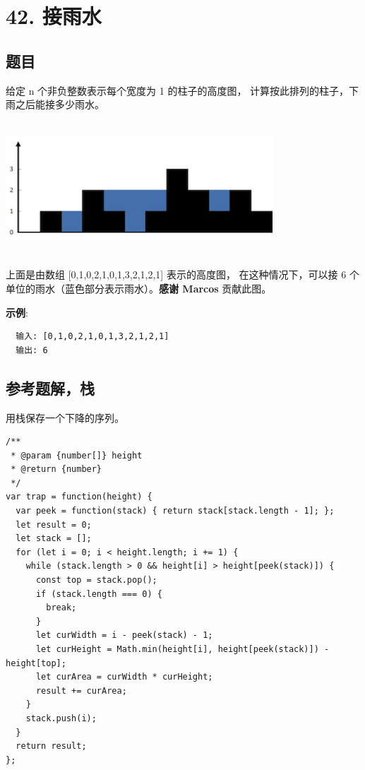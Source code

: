 \newpage
\section{42. 接雨水}
\label{leetcode:42}

\subsection{题目}

给定 n 个非负整数表示每个宽度为 1 的柱子的高度图，
计算按此排列的柱子，下雨之后能接多少雨水。

\includegraphics[width=100mm,height=50mm]{images/leetcode/rainwatertrap.png}

上面是由数组 [0,1,0,2,1,0,1,3,2,1,2,1] 表示的高度图，
在这种情况下，可以接 6 个单位的雨水（蓝色部分表示雨水）。\textbf{感谢 Marcos} 贡献此图。

\textbf{示例}:

\begin{verbatim}
  输入: [0,1,0,2,1,0,1,3,2,1,2,1]
  输出: 6
\end{verbatim}

\subsection{参考题解，栈}

用栈保存一个下降的序列。

\begin{verbatim}
/**
 * @param {number[]} height
 * @return {number}
 */
var trap = function(height) {
  var peek = function(stack) { return stack[stack.length - 1]; };
  let result = 0;
  let stack = [];
  for (let i = 0; i < height.length; i += 1) {
    while (stack.length > 0 && height[i] > height[peek(stack)]) {
      const top = stack.pop();
      if (stack.length === 0) {
        break;
      }
      let curWidth = i - peek(stack) - 1;
      let curHeight = Math.min(height[i], height[peek(stack)]) - height[top];
      let curArea = curWidth * curHeight;
      result += curArea;
    }
    stack.push(i);
  }
  return result;
};
\end{verbatim}
